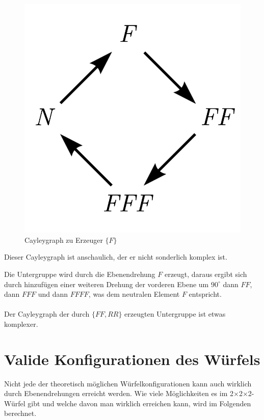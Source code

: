 \documentclass[12pt,a4paper, usenames, dvipsnames]{article}
\newcommand{\Ttwo}{2$\times$2$\times$2-}
\begin{document}
\begin{figure}[h]
\centering
\includegraphics[scale=0.7]{Cayleygraph1.png}
\caption{Cayleygraph zu Erzeuger $\{ F \}$}
\label{27}
\end{figure}

Dieser Cayleygraph ist anschaulich, der er nicht sonderlich komplex ist.

Die Untergruppe wird durch die Ebenendrehung $F$ erzeugt, daraus ergibt sich durch hinzufügen einer weiteren Drehung der vorderen Ebene um $90^\circ$ dann $FF$, dann $FFF$ und dann $FFFF$, was dem neutralen Element $F$ entspricht.
\\
\\
Der Cayleygraph der durch $\{ FF, RR \}$ erzeugten Untergruppe ist etwas komplexer.



%
%
%
%
%
%
%
%
%
%
%
%
%
%
%
%
%
\newpage

\section{Valide Konfigurationen des Würfels}

Nicht jede der theoretisch möglichen Würfelkonfigurationen kann auch wirklich durch Ebenendrehungen erreicht werden. Wie viele Möglichkeiten es im \Ttwo Würfel gibt und welche davon man wirklich erreichen kann, wird im Folgenden berechnet. \\
\end{document}
